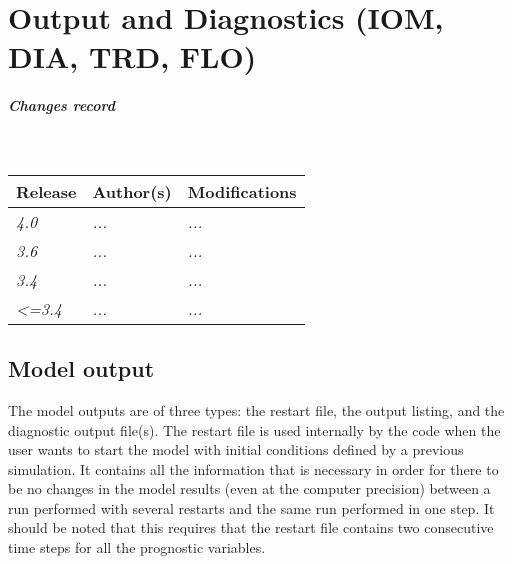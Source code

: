 \documentclass[../main/NEMO_manual]{subfiles}
\begin{document}
\chapter{Output and Diagnostics (IOM, DIA, TRD, FLO)}
\label{chap:DIA}


\chaptertoc

\paragraph{Changes record} ~\\

{\footnotesize
  \begin{tabularx}{\textwidth}{l||X|X}
    Release & Author(s) & Modifications \\
    \hline
    {\em   4.0} & {\em ...} & {\em ...} \\
    {\em   3.6} & {\em ...} & {\em ...} \\
    {\em   3.4} & {\em ...} & {\em ...} \\
    {\em <=3.4} & {\em ...} & {\em ...}
  \end{tabularx}
}

\clearpage

\section{Model output}
\label{sec:DIA_io_old}

The model outputs are of three types: the restart file, the output listing, and the diagnostic output file(s).
The restart file is used internally by the code when the user wants to start the model with
initial conditions defined by a previous simulation.
It contains all the information that is necessary in order for there to be no changes in the model results
(even at the computer precision) between a run performed with several restarts and
the same run performed in one step.
It should be noted that this requires that the restart file contains two consecutive time steps for
all the prognostic variables.
\end{document}
